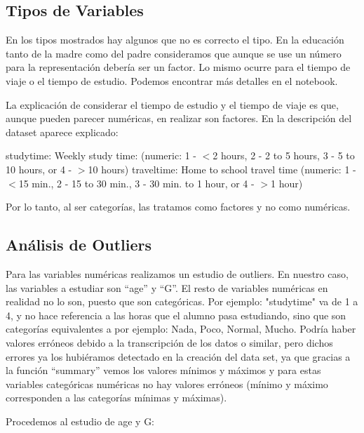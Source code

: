 \documentclass[12pt,a4paper]{article}
\begin{document}
\subsection{Tipos de Variables}
En los tipos mostrados hay algunos que no es correcto el tipo. En la educación tanto de la madre como del padre consideramos que aunque se use un número para la representación debería ser un factor. Lo mismo ocurre para el tiempo de viaje o el tiempo de estudio.  Podemos encontrar más detalles en el notebook. 


La explicación de considerar el tiempo de estudio y el tiempo de viaje es que, aunque pueden parecer numéricas, en realizar son factores. En la descripción del dataset aparece explicado:

studytime: Weekly study time: (numeric: 1 - $<$2 hours, 2 - 2 to 5 hours, 3 - 5 to 10 hours, or 4 - $>$10 hours)
traveltime: Home to school travel time (numeric: 1 - $<$15 min., 2 - 15 to 30 min., 3 - 30 min. to 1 hour, or 4 - $>$1 hour)

Por lo tanto, al ser categorías, las tratamos como factores y no como numéricas.


\subsection{Análisis de Outliers}
Para las variables numéricas realizamos un estudio de outliers. En nuestro caso, las variables a estudiar son ``age'' y ``G''. El resto de variables numéricas en realidad no lo son, puesto que son categóricas. Por ejemplo: "studytime" va de 1 a 4, y no hace referencia a las horas que el alumno pasa estudiando, sino que son categorías equivalentes a por ejemplo: Nada, Poco, Normal, Mucho. Podría haber valores erróneos debido a la transcripción de los datos o similar, pero dichos errores ya los hubiéramos detectado en la creación del data set, ya que gracias a la función ``summary'' vemos los valores mínimos y máximos y para estas variables categóricas numéricas no hay valores erróneos (mínimo y máximo corresponden a las categorías mínimas y máximas).

Procedemos al estudio de age y G:
\end{document}
